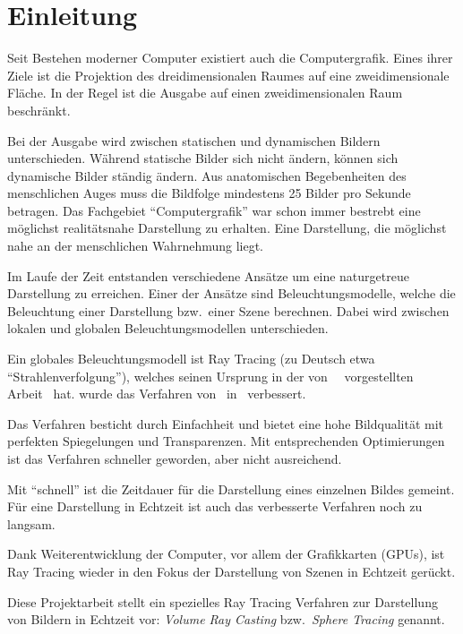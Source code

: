
\chapter{Einleitung}
\label{chap:10_introduction}

Seit Bestehen moderner Computer existiert auch die Computergrafik.
Eines ihrer Ziele ist die Projektion des dreidimensionalen Raumes auf
eine zweidimensionale Fläche. In der Regel ist die Ausgabe auf einen
zweidimensionalen Raum beschränkt.

Bei der Ausgabe wird zwischen statischen und dynamischen Bildern
unterschieden. Während statische Bilder sich nicht ändern, können sich
dynamische Bilder ständig ändern. Aus anatomischen Begebenheiten des
menschlichen Auges muss die Bildfolge mindestens 25 Bilder pro Sekunde
betragen.
Das Fachgebiet ``Computergrafik'' war schon immer bestrebt eine
möglichst realitätsnahe Darstellung zu erhalten. Eine Darstellung, die
möglichst nahe an der menschlichen Wahrnehmung liegt.

Im Laufe der Zeit entstanden verschiedene Ansätze um eine naturgetreue
Darstellung zu erreichen. Einer der Ansätze sind Beleuchtungsmodelle,
welche die Beleuchtung einer Darstellung bzw.\ einer Szene berechnen.
Dabei wird zwischen lokalen und globalen Beleuchtungsmodellen
unterschieden.

Ein globales Beleuchtungsmodell ist Ray Tracing (zu Deutsch etwa
``Strahlenverfolgung''), welches seinen Ursprung in der
von~\citeauthor{appel_techniques_1968}~\citeyear{appel_techniques_1968}
vorgestellten Arbeit~ hat.
\citeyear{whitted_improved_1980} wurde das Verfahren
von~\citeauthor{whitted_improved_1980}
in~ verbessert.

Das Verfahren besticht durch Einfachheit und bietet eine hohe
Bildqualität mit perfekten Spiegelungen und Transparenzen. Mit
entsprechenden Optimierungen ist das Verfahren schneller geworden, aber
nicht ausreichend.

Mit ``schnell'' ist die Zeitdauer für die Darstellung eines einzelnen
Bildes gemeint. Für eine Darstellung in Echtzeit ist auch das
verbesserte Verfahren noch zu langsam.

Dank Weiterentwicklung der Computer, vor allem der Grafikkarten (GPUs),
ist Ray Tracing wieder in den Fokus der Darstellung von Szenen in
Echtzeit gerückt.

Diese Projektarbeit stellt ein spezielles Ray Tracing Verfahren zur
Darstellung von Bildern in Echtzeit vor: \textit{Volume Ray Casting}
bzw.~\textit{Sphere Tracing} genannt.
